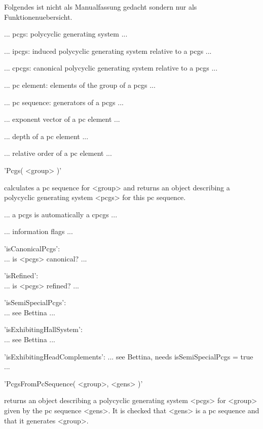 Folgendes ist nicht als Manualfassung gedacht sondern nur als
Funktionenuebersicht.


... pcgs: polycyclic generating system ...

... ipcgs: induced polycyclic generating system relative to a pcgs ...

... cpcgs: canonical polycyclic generating system relative to a pcgs ...

... pc element: elements of the group of a pcgs ...

... pc sequence: generators of a pcgs ...

... exponent vector of a pc element ...

... depth of a pc element ...

... relative order of a pc element ...


'Pcgs( <group> )'

calculates a  pc sequence for <group> and  returns an object describing a
polycyclic generating system <pcgs> for this pc sequence.

... a pcgs is automatically a cpcgs ...

... information flags ...

'isCanonicalPcgs': \\
    ... is <pcgs> canonical? ...

'isRefined': \\
    ... is <pcgs> refined? ...

'isSemiSpecialPcgs': \\
    ... see Bettina ...

'isExhibitingHallSystem': \\
    ... see Bettina ...

'isExhibitingHeadComplements':
    ... see Bettina, needs isSemiSpecialPcgs = true ...


'PcgsFromPcSequence( <group>, <gens> )'

returns  an object describing a   polycyclic generating system <pcgs> for
<group> given by the pc sequence <gens>.  It is checked  that <gens> is a
pc sequence and that it generates <group>.


